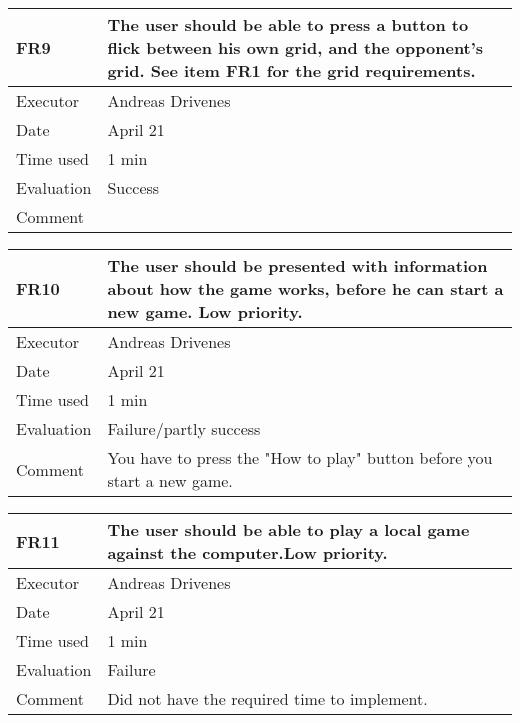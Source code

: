\begin{table}[H]
\begin{tabular}{|l|p{10cm}|}
\hline
\textbf{FR9} & The user should be able to press a button to flick between his own grid, and the opponent's grid. See item FR1 for the grid requirements. \\ \hline
Executor    & Andreas Drivenes            \\ \hline
Date        & April 21            \\ \hline
Time used   & 1 min            \\ \hline
Evaluation  & Success            \\ \hline
Comment     &          \\ \hline
\end{tabular}
\end{table}

\begin{table}[H]
\begin{tabular}{|l|p{10cm}|}
\hline
\textbf{FR10} & The user should be presented with information about how the game works, before he can start a new game. Low priority. \\ \hline
Executor    & Andreas Drivenes            \\ \hline
Date        & April 21            \\ \hline
Time used   & 1 min            \\ \hline
Evaluation  & Failure/partly success            \\ \hline
Comment     & You have to press the "How to play" button before you start a new game.         \\ \hline
\end{tabular}
\end{table}

\begin{table}[H]
\begin{tabular}{|l|p{10cm}|}
\hline
\textbf{FR11} & The user should be able to play a local game against the computer.Low priority. \\ \hline
Executor    & Andreas Drivenes            \\ \hline
Date        & April 21            \\ \hline
Time used   & 1 min            \\ \hline
Evaluation  & Failure            \\ \hline
Comment     & Did not have the required time to implement.         \\ \hline
\end{tabular}
\end{table}



